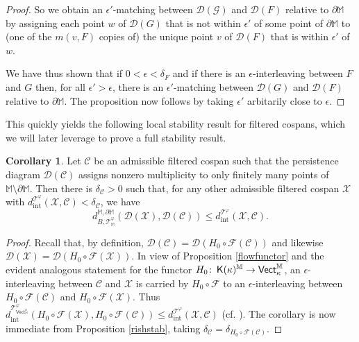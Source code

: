 \documentclass[11pt]{amsart}
\theoremstyle{definition}
\newtheorem{cor}[theorem]{Corollary}
\theoremstyle{remark}
\numberwithin{equation}{section}
\def\co{\colon\thinspace}
\def\ep{\epsilon}
\begin{document}
\begin{proof}
	So we obtain an $\ep'$-matching between $\mathcal{D}(\mathcal{G})$ and $\mathcal{D}(F)$ relative to $\partial\mathbb{M}$ by assigning each point  $w$ of $\mathcal{D}(G)$ that is not within $\ep'$ of some point of $\partial\mathbb{M}$ to (one of the $m(v,F)$ copies of) the unique point $v$ of $\mathcal{D}(F)$ that is within $\ep'$ of $w$.
	
	We have thus shown that if $0<\ep<\delta_F$ and if there is an $\ep$-interleaving between $F$ and $G$ then, for all $\ep'>\ep$, there is an $\ep'$-matching between $\mathcal{D}(G)$ and $\mathcal{D}(F)$ relative to $\partial\mathbb{M}$.  The proposition now follows by taking $\ep'$ arbitarily close to $\ep$. 
\end{proof}

This quickly yields the following local stability result for filtered cospans, which we will later leverage to prove a full stability result.

\begin{cor}\label{localhco}
	Let $\mathcal{C}$ be an admissible filtered cospan such that the persistence diagram $\mathcal{D}(\mathcal{C})$ assigns nonzero multiplicity to only finitely many points of $\mathbb{M}\setminus\partial\mathbb{M}$.  Then there is $\delta_{\mathcal{C}}>0$ such that, for any other admissible filtered cospan $\mathcal{X}$ with
	 $d_{\mathrm{int}}^{\mathcal{T}^{\varphi}}(\mathcal{X},\mathcal{C})<\delta_{\mathcal{C}}$, we have
	  \[ d_{B,\mathcal{T}^{\varphi}_{\mathbb{M}}}^{\mathbb{M},\partial\mathbb{M}}(\mathcal{D}(\mathcal{X}),\mathcal{D}(\mathcal{C}))\leq d_{\mathrm{int}}^{\mathcal{T}^{\varphi}}(\mathcal{X},\mathcal{C}). \] 
\end{cor}

\begin{proof}
	Recall that, by definition, $\mathcal{D}(\mathcal{C})=\mathcal{D}(H_0\circ \mathcal{F}(\mathcal{C}))$ and likewise $\mathcal{D}(\mathcal{X})=\mathcal{D}(H_0\circ \mathcal{F}(\mathcal{X}))$.  In view of Proposition \ref{flowfunctor} and the evident analogous statement for the functor 
	$H_0\co \mathsf{K}(\kappa)^{\mathbb{M}}\to \mathsf{Vect}_{\kappa}^{\mathbb{M}}$, an $\ep$-interleaving between $\mathcal{C}$ and $\mathcal{X}$ is carried by $H_0\circ\mathcal{F}$ to an $\ep$-interleaving between $H_0\circ \mathcal{F}(\mathcal{C})$ and $H_0\circ \mathcal{F}(\mathcal{X})$.  Thus  
	 $d_{\mathrm{int}}^{\mathcal{T}^{\varphi}_{\mathsf{Vect}_{\mathbb{M}}^{\kappa}}}(H_0\circ\mathcal{F}(\mathcal{X}),H_0\circ \mathcal{F}(\mathcal{C}))\leq d_{\mathrm{int}}^{\mathcal{T}^{\varphi}}(\mathcal{X},\mathcal{C})$ (cf. \cite[Theorem 4.3]{dSMS}).  The corollary is now immediate from Proposition \ref{rishstab}, taking $\delta_{\mathcal{C}}=\delta_{H_0\circ\mathcal{F}(\mathcal{C})}$.
\end{proof}
\end{document}
